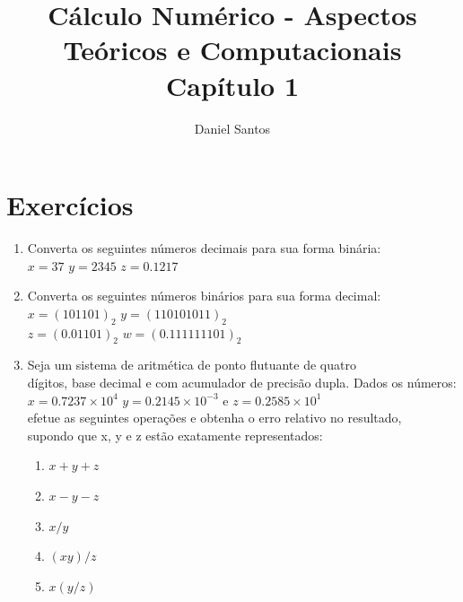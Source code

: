 \documentclass{article}
\title{Cálculo Numérico - Aspectos Teóricos e Computacionais \\ \large Capítulo 1}
\author{Daniel Santos}
\begin{document}
\maketitle

\section*{Exercícios}
\begin{enumerate}
\item Converta os seguintes números decimais para sua forma binária:\\
$x = 37$ \hfil
$y = 2345$ \hfil
$z = 0.1217$

\item Converta os seguintes números binários para sua forma decimal:\\
$x = (101101)_2$  \hfill  $y = (110101011)_2$ \hfill \mbox{} \\
$z = (0.01101)_2$   \hfill  $w = (0.111111101)_2$ \hfill \mbox{}

\item Seja um sistema de aritmética de ponto flutuante de quatro\\ dígitos, base decimal e com acumulador de precisão dupla. Dados os números: \\
$x=0.7237 \times 10^{4}$\quad
$y = 0.2145 \times 10^{-3}$ \quad
e \quad $z=0.2585 \times 10^{1}$ \\
efetue as seguintes operações e obtenha o erro relativo no resultado,\\ supondo que x, y e z estão exatamente representados:
\begin{enumerate}
    \item $x+y+z$
    \item $x-y-z$
    \item $x/y$
    \item $(xy)/z$
    \item $x(y/z)$
\end{enumerate}

\end{enumerate}
\end{document}

